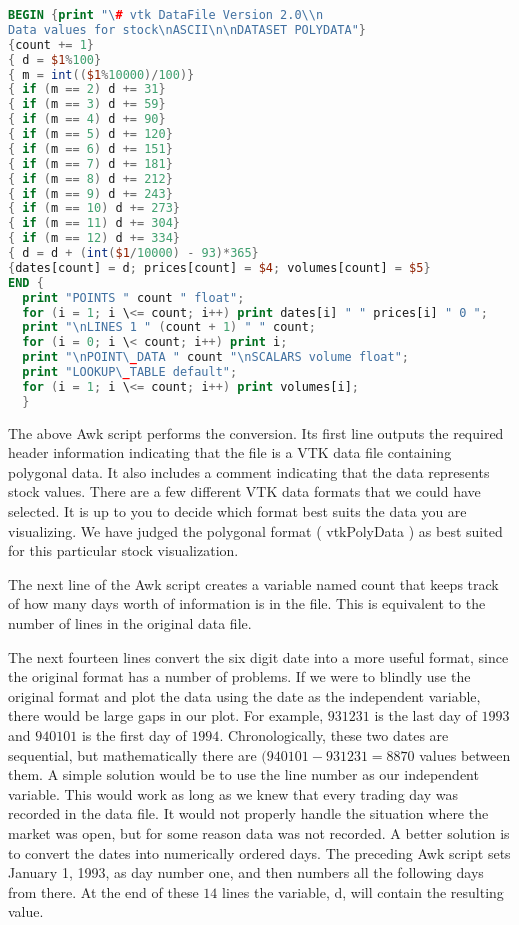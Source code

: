 \begin{lstlisting}[language=Awk, caption={Awk: converting data file to VTK.}]
BEGIN {print "\# vtk DataFile Version 2.0\\n
Data values for stock\nASCII\n\nDATASET POLYDATA"}
{count += 1}
{ d = $1%100}
{ m = int(($1%10000)/100)}
{ if (m == 2) d += 31}
{ if (m == 3) d += 59}
{ if (m == 4) d += 90}
{ if (m == 5) d += 120}
{ if (m == 6) d += 151}
{ if (m == 7) d += 181}
{ if (m == 8) d += 212}
{ if (m == 9) d += 243}
{ if (m == 10) d += 273}
{ if (m == 11) d += 304}
{ if (m == 12) d += 334}
{ d = d + (int($1/10000) - 93)*365}
{dates[count] = d; prices[count] = $4; volumes[count] = $5}
END {
  print "POINTS " count " float";
  for (i = 1; i \<= count; i++) print dates[i] " " prices[i] " 0 ";
  print "\nLINES 1 " (count + 1) " " count;
  for (i = 0; i \< count; i++) print i;
  print "\nPOINT\_DATA " count "\nSCALARS volume float";
  print "LOOKUP\_TABLE default";
  for (i = 1; i \<= count; i++) print volumes[i];
  }
\end{lstlisting}

The above Awk script performs the conversion. Its first line outputs the required header information indicating that the file is a VTK data file containing polygonal data. It also includes a comment indicating that the data represents stock values. There are a few different VTK data formats that we could have selected. It is up to you to decide which format best suits the data you are visualizing. We have judged the polygonal format ( vtkPolyData ) as best suited for this particular stock visualization.

The next line of the Awk script creates a variable named count that keeps track of how many days worth of information is in the file. This is equivalent to the number of lines in the original data file.

The next fourteen lines convert the six digit date into a more useful format, since the original format has a number of problems. If we were to blindly use the original format and plot the data using the date as the independent variable, there would be large gaps in our plot. For example,  $931231$ is the last day of $1993$ and $940101$ is the first day of $1994$. Chronologically, these two dates are sequential, but mathematically there are $(940101 - 931231 = 8870$ values between them. A simple solution would be to use the line number as our independent variable. This would work as long as we knew that every trading day was recorded in the data file. It would not properly handle the situation where the market was open, but for some reason data was not recorded. A better solution is to convert the dates into numerically ordered days. The preceding Awk script sets January 1, 1993, as day number one, and then numbers all the following days from there. At the end of these $14$ lines the variable, d, will contain the resulting value.

